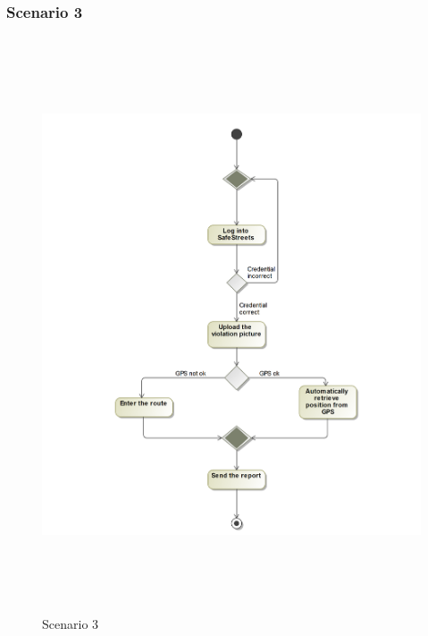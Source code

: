 \subsubsection{Scenario 3}
\begin{figure}[H]
	\begin{minipage}[b]{0.40\textwidth}
		\includegraphics[width=12cm,height=17cm]{Images/ActivityRASD/Scenario3.png}
		\caption{Scenario 3}
	\end{minipage}
\end{figure}
\newpage
